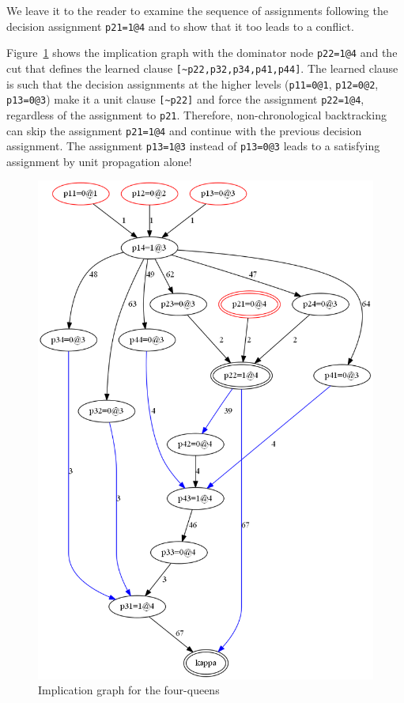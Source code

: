 \documentclass[11pt]{report}
\newcommand*{\p}[1]{\textup{\texttt{#1}}}
\begin{document}
We leave it to the reader to examine the sequence of assignments
following the decision assignment \p{p21=1@4} and to show that it too
leads to a conflict.

Figure~\ref{queens-ig} shows the implication graph with the dominator
node \verb+p22=1@4+ and the cut that defines the learned clause
\verb+[~p22,p32,p34,p41,p44]+. The learned clause is such that the
decision assignments at the higher levels (\verb+p11=0@1+,
\verb+p12=0@2+, \verb+p13=0@3+) make it a unit clause \verb+[~p22]+ and
force the assignment \p{p22=1@4}, regardless of the assignment to
\p{p21}. Therefore, non-chronological backtracking can skip the
assignment \p{p21=1@4} and continue with the previous decision
assignment. The assignment \p{p13=1@3} instead of \p{p13=0@3} leads to a
satisfying assignment by unit propagation alone!
 
\begin{figure}[b]
\begin{center}
\includegraphics[keepaspectratio=true,height=.8\textheight]{queens-color}
\end{center}
\caption{Implication graph for the four-queens}\label{queens-ig}
\end{figure}
\end{document}

